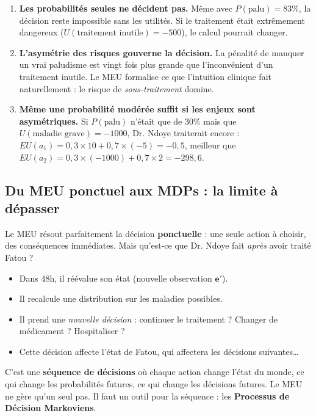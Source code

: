 \documentclass[11pt,a4paper]{article}
\begin{document}
\begin{retenirbox}
\begin{enumerate}
    \item \textbf{Les probabilités seules ne décident pas.} Même avec $P(\text{palu}) = 83\%$, la décision reste impossible sans les utilités. Si le traitement était extrêmement dangereux ($U(\text{traitement inutile}) = -500$), le calcul pourrait changer.

    \item \textbf{L'asymétrie des risques gouverne la décision.} La pénalité de manquer un vrai paludisme est vingt fois plus grande que l'inconvénient d'un traitement inutile. Le MEU formalise ce que l'intuition clinique fait naturellement : le risque de \textit{sous-traitement} domine.

    \item \textbf{Même une probabilité modérée suffit si les enjeux sont asymétriques.} Si $P(\text{palu})$ n'était que de $30\%$ mais que $U(\text{maladie grave}) = -1000$, Dr. Ndoye traiterait encore : $EU(a_1) = 0{,}3\times 10 + 0{,}7\times(-5) = -0{,}5$, meilleur que $EU(a_2) = 0{,}3\times(-1000) + 0{,}7\times 2 = -298{,}6$.
\end{enumerate}
\end{retenirbox}

\subsection{Du MEU ponctuel aux MDPs : la limite à dépasser}

Le MEU résout parfaitement la décision \textbf{ponctuelle} : une seule action à choisir, des conséquences immédiates. Mais qu'est-ce que Dr. Ndoye fait \textit{après} avoir traité Fatou ?
\begin{itemize}[nosep]
    \item Dans 48h, il réévalue son état (nouvelle observation $\mathbf{e}'$).
    \item Il recalcule une distribution sur les maladies possibles.
    \item Il prend une \textit{nouvelle décision} : continuer le traitement ? Changer de médicament ? Hospitaliser ?
    \item Cette décision affecte l'état de Fatou, qui affectera les décisions suivantes\ldots
\end{itemize}

C'est une \textbf{séquence de décisions} où chaque action change l'état du monde, ce qui change les probabilités futures, ce qui change les décisions futures. Le MEU ne gère qu'un seul pas. Il faut un outil pour la séquence : les \textbf{Processus de Décision Markoviens}.
\end{document}
